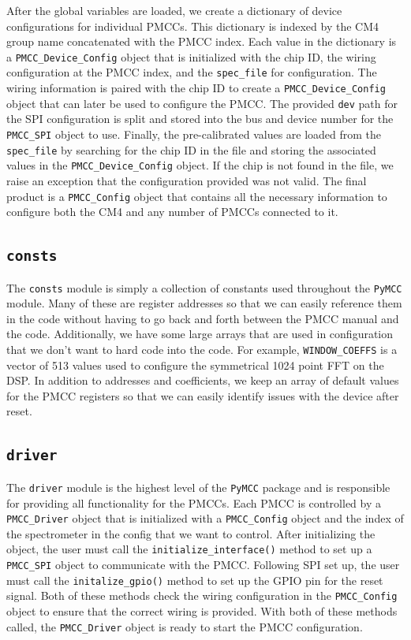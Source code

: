 After the global variables are loaded, we create a dictionary of device configurations for individual PMCCs. 
This dictionary is indexed by the CM4 group name concatenated with the PMCC index.
Each value in the dictionary is a \texttt{PMCC\_Device\_Config} object that is initialized with the chip ID, the wiring configuration at the PMCC index, and the \texttt{spec\_file} for configuration.
The wiring information is paired with the chip ID to create a \texttt{PMCC\_Device\_Config} object that can later be used to configure the PMCC. 
The provided \texttt{dev} path for the SPI configuration is split and stored into the bus and device number for the \texttt{PMCC\_SPI} object to use.
Finally, the pre-calibrated values are loaded from the \texttt{spec\_file} by searching for the chip ID in the file and storing the associated values in the \texttt{PMCC\_Device\_Config} object.
If the chip is not found in the file, we raise an exception that the configuration provided was not valid. 
The final product is a \texttt{PMCC\_Config} object that contains all the necessary information to configure both the CM4 and any number of PMCCs connected to it. 

\subsection{\texttt{consts}}
The \texttt{consts} module is simply a collection of constants used throughout the \texttt{PyMCC} module.
Many of these are register addresses so that we can easily reference them in the code without having to go back and forth between the PMCC manual and the code.
Additionally, we have some large arrays that are used in configuration that we don't want to hard code into the code.
For example, \texttt{WINDOW\_COEFFS} is a vector of 513 values used to configure the symmetrical 1024 point FFT on the DSP. 
In addition to addresses and coefficients, we keep an array of default values for the PMCC registers so that we can easily identify issues with the device after reset. 

\subsection{\texttt{driver}}
The \texttt{driver} module is the highest level of the \texttt{PyMCC} package and is responsible for providing all functionality for the PMCCs. 
Each PMCC is controlled by a \texttt{PMCC\_Driver} object that is initialized with a \texttt{PMCC\_Config} object and the index of the spectrometer in the config that we want to control.
After initializing the object, the user must call the \texttt{initialize\_interface()} method to set up a \texttt{PMCC\_SPI} object to communicate with the PMCC.
Following SPI set up, the user must call the \texttt{initalize\_gpio()} method to set up the GPIO pin for the reset signal.
Both of these methods check the wiring configuration in the \texttt{PMCC\_Config} object to ensure that the correct wiring is provided.
With both of these methods called, the \texttt{PMCC\_Driver} object is ready to start the PMCC configuration. 

